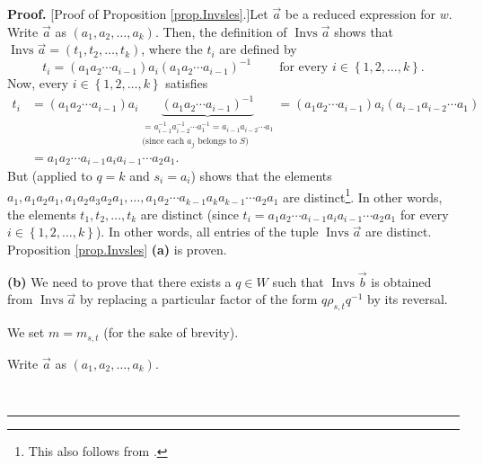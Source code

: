 \documentclass
[numbers=enddot,12pt,final,onecolumn,notitlepage,abstracton]{scrartcl}%
\theoremstyle{definition}
\newenvironment{proof}[1][Proof]{\noindent\textbf{#1.} }{\ \rule{0.5em}{0.5em}}
\begin{document}
\begin{proof}
[Proof of Proposition \ref{prop.Invsles}.]Let $\overrightarrow{a}$ be a
reduced expression for $w$. Write $\overrightarrow{a}$ as $\left(  a_{1}%
,a_{2},\ldots,a_{k}\right)  $. Then, the definition of $\operatorname*{Invs}%
\overrightarrow{a}$ shows that $\operatorname*{Invs}\overrightarrow{a}=\left(
t_{1},t_{2},\ldots,t_{k}\right)  $, where the $t_{i}$ are defined by%
\[
t_{i}=\left(  a_{1}a_{2}\cdots a_{i-1}\right)  a_{i}\left(  a_{1}a_{2}\cdots
a_{i-1}\right)  ^{-1}\ \ \ \ \ \ \ \ \ \ \text{for every }i\in\left\{
1,2,\ldots,k\right\}  .
\]
Now, every $i\in\left\{  1,2,\ldots,k\right\}  $ satisfies%
\begin{align*}
t_{i}  &  =\left(  a_{1}a_{2}\cdots a_{i-1}\right)  a_{i}\underbrace{\left(
a_{1}a_{2}\cdots a_{i-1}\right)  ^{-1}}_{\substack{=a_{i-1}^{-1}a_{i-2}%
^{-1}\cdots a_{1}^{-1}=a_{i-1}a_{i-2}\cdots a_{1}\\\text{(since each }%
a_{j}\text{ belongs to }S\text{)}}}=\left(  a_{1}a_{2}\cdots a_{i-1}\right)
a_{i}\left(  a_{i-1}a_{i-2}\cdots a_{1}\right) \\
&  =a_{1}a_{2}\cdots a_{i-1}a_{i}a_{i-1}\cdots a_{2}a_{1}.
\end{align*}
But \cite[Proposition 1.6 (a)]{Lusztig-Hecke} (applied to $q=k$ and
$s_{i}=a_{i}$) shows that the elements $a_{1},a_{1}a_{2}a_{1},a_{1}a_{2}%
a_{3}a_{2}a_{1},\ldots,a_{1}a_{2}\cdots a_{k-1}a_{k}a_{k-1}\cdots a_{2}a_{1}$
are distinct\footnote{This also follows from \cite[Chapter 4, n$^{\circ}$ 1.4,
Lemme 2]{Bourbaki4-6}.}. In other words, the elements $t_{1},t_{2}%
,\ldots,t_{k}$ are distinct (since \newline$t_{i}=a_{1}a_{2}\cdots
a_{i-1}a_{i}a_{i-1}\cdots a_{2}a_{1}$ for every $i\in\left\{  1,2,\ldots
,k\right\}  $). In other words, all entries of the tuple $\operatorname*{Invs}%
\overrightarrow{a}$ are distinct. Proposition \ref{prop.Invsles} \textbf{(a)}
is proven. \medskip

\textbf{(b)} We need to prove that there exists a $q\in W$ such that
$\operatorname*{Invs}\overrightarrow{b}$ is obtained from
$\operatorname*{Invs}\overrightarrow{a}$ by replacing a particular factor of
the form $q\rho_{s,t}q^{-1}$ by its reversal.

We set $m=m_{s,t}$ (for the sake of brevity).

Write $\overrightarrow{a}$ as $\left(  a_{1},a_{2},\ldots,a_{k}\right)  $.


\end{proof}
\end{document}
